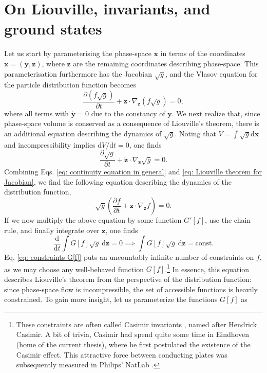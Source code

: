 \section{On Liouville, invariants, and ground states}
Let us start by parameterising the phase-space $\boldsymbol{x}$ in terms of the coordinates $\boldsymbol{x}=(\boldsymbol{y},\boldsymbol{z})$, where $\boldsymbol{z}$ are the remaining coordinates describing phase-space. This parameterisation furthermore has the Jacobian $\sqrt{g}$, and the Vlasov equation for the particle distribution function becomes
\begin{equation}
    \frac{\partial (f\sqrt{g})}{\partial t} + \dot{\boldsymbol{z}} \cdot  \nabla_{\boldsymbol{z}} (f\sqrt{g}) = 0,
    \label{eq: continuity equation in general}
\end{equation}
where all terms with $\dot{\boldsymbol{y}}=0$ due to the constancy of $\boldsymbol{y}$. We next realize that, since phase-space volume is conserved as a consequence of Liouville's theorem, there is an additional equation describing the dynamics of $\sqrt{g}$. Noting that $V = \int \sqrt{g} \mathrm{d}\boldsymbol{x}$ and incompressibility implies $\mathrm{d}V/\mathrm{d}t=0$, one finds
\begin{equation}
    \frac{\partial \sqrt{g}}{\partial t} + \dot{\boldsymbol{z}} \cdot \nabla_{\boldsymbol{z}} \sqrt{g} = 0.
    \label{eq: Liouville theorem for Jacobian}
\end{equation}
Combining Eqs. \eqref{eq: continuity equation in general} and \eqref{eq: Liouville theorem for Jacobian}, we find the following equation describing the dynamics of the distribution function,
\begin{equation}
    \sqrt{g} \left( \frac{\partial f}{\partial t} + \dot{\boldsymbol{z}} \cdot \nabla_{\boldsymbol{z}} f \right) = 0.
\end{equation}
If we now multiply the above equation by some function $G'[f]$, use the chain rule, and finally integrate over $\boldsymbol{z}$, one finds
\begin{equation}
    \frac{\mathrm{d}}{\mathrm{d} t} \int G[f] \sqrt{g} \: \mathrm{d} \boldsymbol{z} = 0 \implies \int G[f] \sqrt{g} \: \mathrm{d} \boldsymbol{z} = \mathrm{const.}
    \label{eq: constraints G[f]}
\end{equation}
Eq. \eqref{eq: constraints G[f]} puts an uncountably infinite number of constraints on $f$, as we may choose any well-behaved function $G[f]$.\footnote{These constraints are often called Casimir invariants \cite{ye1992action}, named after Hendrick Casimir. A bit of trivia, Casimir had spend quite some time in Eindhoven (home of the current thesis), where he first postulated the existence of the Casimir effect. This attractive force between conducting plates was subsequently measured in Philips' NatLab \cite{lambrecht2002casimir,sarlemijn2012physics}.} In essence, this equation describes Liouville's theorem from the perspective of the distribution function: since phase-space flow is incompressible, the set of accessible functions is heavily constrained. To gain more insight, let us parameterize the functions $G[f]$ as
